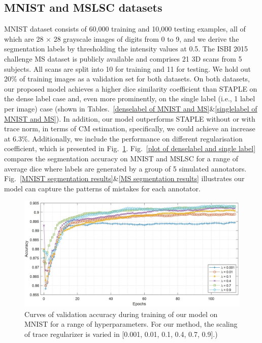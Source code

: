 \subsection{MNIST and MSLSC datasets}
MNIST dataset consists of 60,000 training and 10,000 testing examples, all of which are 28 $\times$ 28 grayscale images of digits from 0 to 9, and we derive the segmentation labels by thresholding the intensity values at 0.5. The ISBI 2015 challenge MS dataset is publicly available and comprises 21 3D scans from 5 subjects. All scans are split into 10 for training and 11 for testing. We hold out 20\% of training images as a validation set for both datasets. On both datasets, our proposed model achieves a higher dice similarity coefficient than STAPLE on the dense label case and, even more prominently, on the single label (i.e., 1 label per image) case (shown in Tables.~\ref{denselabel of MNIST and MS}\&\ref{singlelabel of MNIST and MS}). In addition, our model outperforms STAPLE without or with trace norm, in terms of CM estimation, specifically, we could achieve an increase at $6.3\%$. Additionally, we include the performance on different regularisation coefficient, which is presented in Fig.~\ref{Paramater lambda}. Fig.~\ref{plot of denselabel and single label} compares the segmentation accuracy on MNIST and MSLSC for a range of average dice where labels are generated by a group of 5 simulated annotators. Fig.~\ref{MNIST segmentation results}\&\ref{MS segmentation results} illustrates our model can capture the patterns of mistakes for each annotator.

\begin{figure}[t]
        \center
        \includegraphics[width=\linewidth]{chapter_8/picture2.jpg}
        \caption{Curves of validation accuracy during training of our model on MNIST for a range of hyperparameters. For our method, the scaling of trace regularizer is varied in [0.001, 0.01, 0.1, 0.4, 0.7, 0.9].)}
        \label{Paramater lambda}
\end{figure}
    
